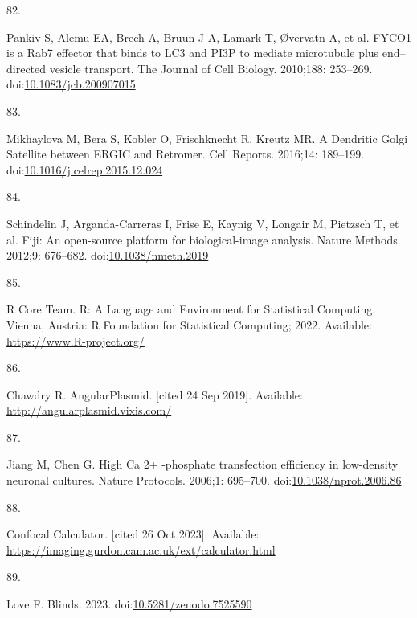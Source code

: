 \documentclass[
  12pt,
  a4paper,
]{book}
\newlength{\cslhangindent}
\newlength{\csllabelwidth}
\newlength{\cslentryspacingunit} %
\newenvironment{CSLReferences}[2] %
 {%
  \setlength{\parindent}{0pt}
  \ifodd #1
  \let\oldpar\par
  \def\par{\hangindent=\cslhangindent\oldpar}
  \fi
  \setlength{\parskip}{#2\cslentryspacingunit}
 }%
 {}
\newcommand{\CSLLeftMargin}[1]{\parbox[t]{\csllabelwidth}{#1}}
\newcommand{\CSLRightInline}[1]{\parbox[t]{\linewidth - \csllabelwidth}{#1}\break}
\begin{document}
\begin{CSLReferences}{0}{0}
\leavevmode{}%
\CSLLeftMargin{82. }%
\CSLRightInline{Pankiv S, Alemu EA, Brech A, Bruun J-A, Lamark T, Øvervatn A, et al. {FYCO1} is a {Rab7} effector that binds to {LC3} and {PI3P} to mediate microtubule plus end--directed vesicle transport. The Journal of Cell Biology. 2010;188: 253--269. doi:\href{https://doi.org/10.1083/jcb.200907015}{10.1083/jcb.200907015}}

\leavevmode{}%
\CSLLeftMargin{83. }%
\CSLRightInline{Mikhaylova M, Bera S, Kobler O, Frischknecht R, Kreutz MR. A {Dendritic Golgi Satellite} between {ERGIC} and {Retromer}. Cell Reports. 2016;14: 189--199. doi:\href{https://doi.org/10.1016/j.celrep.2015.12.024}{10.1016/j.celrep.2015.12.024}}

\leavevmode{}%
\CSLLeftMargin{84. }%
\CSLRightInline{Schindelin J, Arganda-Carreras I, Frise E, Kaynig V, Longair M, Pietzsch T, et al. Fiji: An open-source platform for biological-image analysis. Nature Methods. 2012;9: 676--682. doi:\href{https://doi.org/10.1038/nmeth.2019}{10.1038/nmeth.2019}}

\leavevmode{}%
\CSLLeftMargin{85. }%
\CSLRightInline{R Core Team. R: {A Language} and {Environment} for {Statistical Computing}. {Vienna, Austria}: {R Foundation for Statistical Computing}; 2022. Available: \url{https://www.R-project.org/}}

\leavevmode{}%
\CSLLeftMargin{86. }%
\CSLRightInline{Chawdry R. {AngularPlasmid}. {[}cited 24 Sep 2019{]}. Available: \url{http://angularplasmid.vixis.com/}}

\leavevmode{}%
\CSLLeftMargin{87. }%
\CSLRightInline{Jiang M, Chen G. High {Ca} 2+ -phosphate transfection efficiency in low-density neuronal cultures. Nature Protocols. 2006;1: 695--700. doi:\href{https://doi.org/10.1038/nprot.2006.86}{10.1038/nprot.2006.86}}

\leavevmode{}%
\CSLLeftMargin{88. }%
\CSLRightInline{Confocal {Calculator}. {[}cited 26 Oct 2023{]}. Available: \url{https://imaging.gurdon.cam.ac.uk/ext/calculator.html}}

\leavevmode{}%
\CSLLeftMargin{89. }%
\CSLRightInline{Love F. Blinds. 2023. doi:\href{https://doi.org/10.5281/zenodo.7525590}{10.5281/zenodo.7525590}}


\end{CSLReferences}
\end{document}
